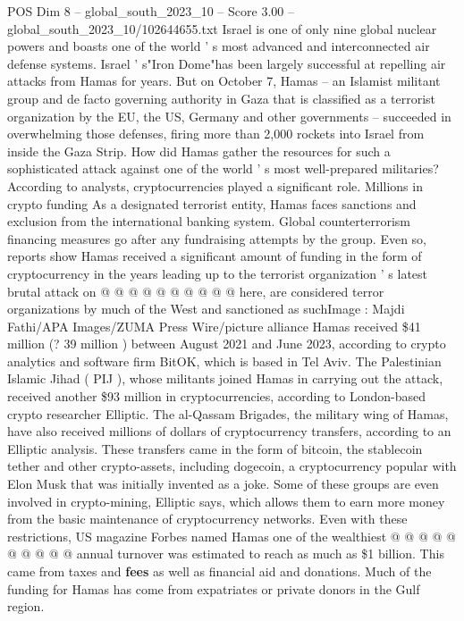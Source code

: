 \begin{textsample}{POS Dim 8 – global\_south\_2023\_10 – Score 3.00 – global\_south\_2023\_10/102644655.txt}  \label{ex:f8_pos_360}
Israel is one of only nine global nuclear powers and boasts one of the world ' s most advanced and interconnected air defense systems.
Israel ' s"Iron Dome"has been largely successful at repelling air attacks from Hamas for years.
But on October 7, Hamas -- an Islamist militant group and de facto governing authority in Gaza that is classified as a terrorist organization by the EU, the US, Germany and other governments -- succeeded in overwhelming those defenses, firing more than 2,000 rockets into Israel from inside the Gaza Strip.
How did Hamas gather the resources for such a sophisticated attack against one of the world ' s most well-prepared militaries?
According to analysts, cryptocurrencies played a significant role.
Millions in crypto funding As a designated terrorist entity, Hamas faces sanctions and exclusion from the international banking system.
Global counterterrorism financing measures go after any fundraising attempts by the group.
Even so, reports show Hamas received a significant amount of funding in the form of cryptocurrency in the years leading up to the terrorist organization ' s latest brutal attack on @ @ @ @ @ @ @ @ @ @ here, are considered terror organizations by much of the West and sanctioned as suchImage : Majdi Fathi/APA Images/ZUMA Press Wire/picture alliance Hamas received \$41 million (? 39 million ) between August 2021 and June 2023, according to crypto analytics and software firm BitOK, which is based in Tel Aviv.
The Palestinian Islamic Jihad ( PIJ ), whose militants joined Hamas in carrying out the attack, received another \$93 million in cryptocurrencies, according to London-based crypto researcher Elliptic.
The al-Qassam Brigades, the military wing of Hamas, have also received millions of dollars of cryptocurrency transfers, according to an Elliptic analysis.
These transfers came in the form of bitcoin, the stablecoin tether and other crypto-assets, including dogecoin, a cryptocurrency popular with Elon Musk that was initially invented as a joke.
Some of these groups are even involved in crypto-mining, Elliptic says, which allows them to earn more money from the basic maintenance of cryptocurrency networks.
Even with these restrictions, US magazine Forbes named Hamas one of the wealthiest @ @ @ @ @ @ @ @ @ @ annual turnover was estimated to reach as much as \$1 billion.
This came from taxes and \textbf{fees} as well as financial aid and donations.
Much of the funding for Hamas has come from expatriates or private donors in the Gulf region.

\end{textsample}
